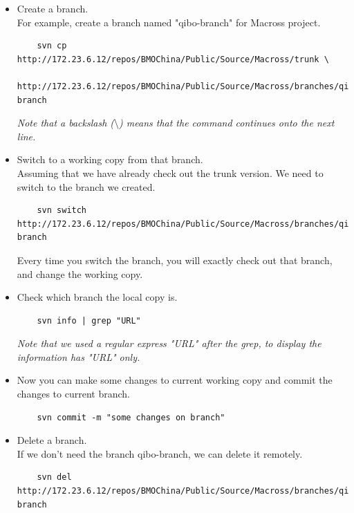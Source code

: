 \begin{itemize}
\item
	Create a branch.\\
	For example, create a branch named "qibo-branch" for Macross project.
	\begin{lstlisting}
	svn cp http://172.23.6.12/repos/BMOChina/Public/Source/Macross/trunk \
	http://172.23.6.12/repos/BMOChina/Public/Source/Macross/branches/qibo-branch
	\end{lstlisting}	
\textit{Note that a backslash ($\setminus$) means that the command continues onto the next line.}	
\item
	Switch to a working copy from that branch. \\ 
	Assuming that we have already check out the trunk version. We need to switch to the branch we created.
	\begin{lstlisting}
	svn switch http://172.23.6.12/repos/BMOChina/Public/Source/Macross/branches/qibo-branch
	\end{lstlisting}	
	Every time you switch the branch, you will exactly check out that branch, and change the working copy.
\item
	Check which branch the local copy is.
	\begin{lstlisting}
	svn info | grep "URL"
	\end{lstlisting}	
\textit{Note that we used a regular express "URL" after the grep, to display the information has "URL" only.}
\item
	Now you can make some changes to current working copy and commit the changes to current branch.
	\begin{lstlisting}
	svn commit -m "some changes on branch"
	\end{lstlisting}	
\item
	Delete a branch. \\ 
	If we don't need the branch qibo-branch, we can delete it remotely.
	\begin{lstlisting}
	svn del http://172.23.6.12/repos/BMOChina/Public/Source/Macross/branches/qibo-branch
	\end{lstlisting}
\end{itemize}

